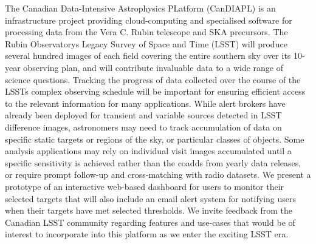 The Canadian Data-Intensive Astrophysics PLatform (CanDIAPL) is an infrastructure project providing cloud-computing and specialised software for processing data from the Vera C. Rubin telescope and SKA precursors. The Rubin Observatorys Legacy Survey of Space and Time (LSST) will produce several hundred images of each field covering the entire southern sky over its 10-year observing plan, and will contribute invaluable data to a wide range of science questions. Tracking the progress of data collected over the course of the LSSTs complex observing schedule will be important for ensuring efficient access to the relevant information for many applications. While alert brokers have already been deployed for transient and variable sources detected in LSST difference images, astronomers may need to track accumulation of data on specific static targets or regions of the sky, or particular classes of objects. Some analysis applications may rely on individual visit images accumulated until a specific sensitivity is achieved rather than the coadds from yearly data releases, or require prompt follow-up and cross-matching with radio datasets. We present a prototype of an interactive web-based dashboard for users to monitor their selected targets that will also include an email alert system for notifying users when their targets have met selected thresholds. We invite feedback from the Canadian LSST community regarding features and use-cases that would be of interest to incorporate into this platform as we enter the exciting LSST era.

